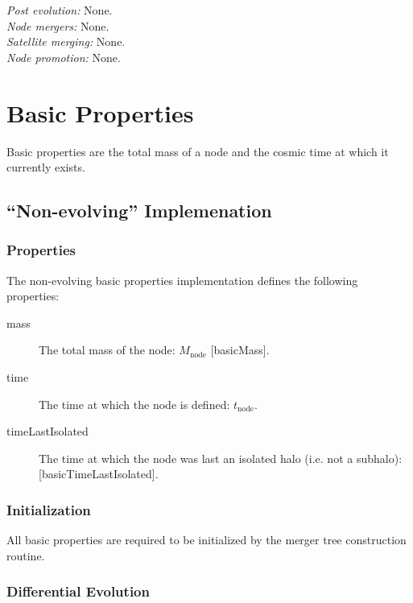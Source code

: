 \noindent\emph{Post evolution:} None.\\

\noindent\emph{Node mergers:} None.\\

\noindent\emph{Satellite merging:} None.\\

\noindent\emph{Node promotion:} None.\\

\section{Basic Properties}\label{sec:ComponentBasicProperties}

Basic properties are the total mass of a \gls{node} and the cosmic time at which it currently exists.

\subsection{``Non-evolving'' Implemenation}

\subsubsection{Properties}

The non-evolving basic properties implementation defines the following properties:
\begin{description}
 \item [{\normalfont \ttfamily mass}] The total mass of the node: $M_\mathrm{node}$ [{\normalfont \ttfamily basicMass}].
 \item [{\normalfont \ttfamily time}] The time at which the \gls{node} is defined: $t_\mathrm{node}$.
 \item [{\normalfont \ttfamily timeLastIsolated}] The time at which the \gls{node} was last an isolated halo (i.e. not a subhalo): [\normalfont \ttfamily basicTimeLastIsolated].
\end{description}

\subsubsection{Initialization}

All basic properties are required to be initialized by the merger tree construction routine.

\subsubsection{Differential Evolution}

